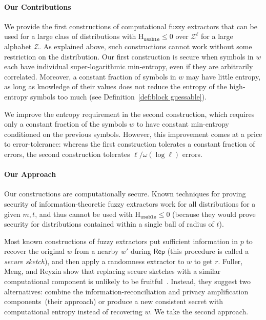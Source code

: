 \documentclass[11pt]{article}
\newcommand{\defref}[1]{\mbox{Definition~\ref{#1}}}
\newcommand{\class}[1]{{\ensuremath{\mathsf{#1}}}}
\newcommand{\rep}{\ensuremath{\class{Rep}}\xspace}
\newcommand{\Huse}{\mathrm{H}_{\mathtt{usable}}}
\begin{document}
\paragraph{Our Contributions}
We provide the first constructions of computational fuzzy extractors that can be used for a large class of distributions with $\Huse\le 0$ over $\mathcal{Z}^\ell$ for a large alphabet $\mathcal{Z}$.  As explained above, such constructions cannot work without some restriction on the distribution.
Our first construction is secure when symbols in $w$
each have individual super-logarithmic min-entropy, even if they are arbitrarily correlated. Moreover,
a constant fraction of symbols in $w$ may have little entropy, as long as knowledge of their values does not reduce the entropy of the high-entropy symbols too much (see \defref{def:block guessable}).

We improve the entropy requirement in the second construction, which requires only a constant fraction of the symbols $w$ to have constant min-entropy conditioned on the previous symbols.
However, this improvement comes at a price to error-tolerance: whereas the first construction tolerates a constant fraction of errors, the second construction tolerates $\ell/\omega(\log\ell)$ errors.



\paragraph{Our Approach}
Our constructions are computationally secure.  Known techniques for proving security of information-theoretic  fuzzy extractors work for all distributions for a given $m, t$, and thus cannot be used with $\Huse\le 0$ (because they would prove security for distributions contained within a single ball of radius of $t$).

Most known constructions of fuzzy extractors put sufficient information in $p$ to recover the original $w$ from a nearby $w'$ during $\rep$ (this procedure is called a \emph{secure sketch}), and then apply a randomness extractor to $w$ to get $r$.
Fuller, Meng, and Reyzin show that replacing secure sketches with a similar computational component is unlikely to be fruitful~\cite[Corollary 3.8, Theorem 3.10]{fuller2013computational}.  Instead, they suggest two alternatives: combine the information-reconciliation and privacy amplification components~(their approach) or produce a new consistent secret with computational entropy instead of recovering $w$.  We take the second approach.
\end{document}
